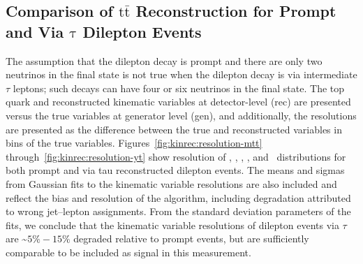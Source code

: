 \clearpage
\subsection{Comparison of \ensuremath{\mathrm{t\bar{t}}} Reconstruction for Prompt and Via \ensuremath{\mathrm{\tau}} Dilepton Events}
The assumption that the dilepton decay is prompt and there are only two neutrinos in the final state is not true when the dilepton decay is via intermediate $\tau$ leptons; such decays can have four or six neutrinos in the final state.
The top quark and \ttbar reconstructed kinematic variables at detector-level (rec) are presented versus the true variables at generator level (gen), and additionally, the resolutions are presented as the difference between the true and reconstructed variables in bins of the true variables. 
Figures~\ref{fig:kinrec:resolution-mtt} through~\ref{fig:kinrec:resolution-yt} show resolution of \mtt, \ytt, \pttt, \yt, and \ptt\ distributions for both prompt and via tau reconstructed \ttbar dilepton events. 
The means and sigmas from Gaussian fits to the kinematic variable resolutions are also included and reflect the bias and resolution of the algorithm, including degradation attributed to wrong jet--lepton assignments. 
From the standard deviation parameters of the fits, we conclude that the kinematic variable resolutions of \ttbar dilepton events via $\tau$ are \sim$5\% - 15\%$ degraded relative to prompt events, but are sufficiently comparable to be included as signal in this measurement.

